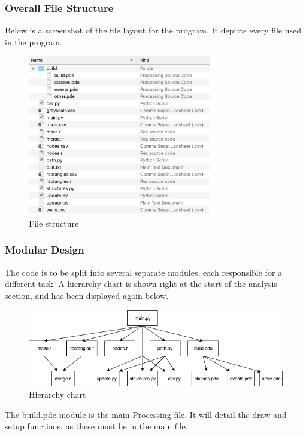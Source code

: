 \documentclass[titlepage]{article}
\begin{document}
\subsubsection{Overall File Structure}
Below is a screenshot of the file layout for the program. It depicts every file used in the program.

\begin{figure}[H]
  \centering
  \includegraphics[width=8cm]{files.png}
  \caption{File structure}
  \label{fig:dijk}
\end{figure}

\subsubsection{Modular Design}
The code is to be split into several separate modules, each responsible for a different task. A hierarchy chart is shown right at the start of the analysis section, and has been displayed again below.\\

\begin{figure}[H]
  \centering
  \includegraphics[width=12cm]{Hierarchy.png}
  \caption{Hierarchy chart}
  \label{fig:dijk}
\end{figure}

The build.pde module is the main Processing file. It will detail the draw and setup functions, as these must be in the main file.\\
\end{document}

